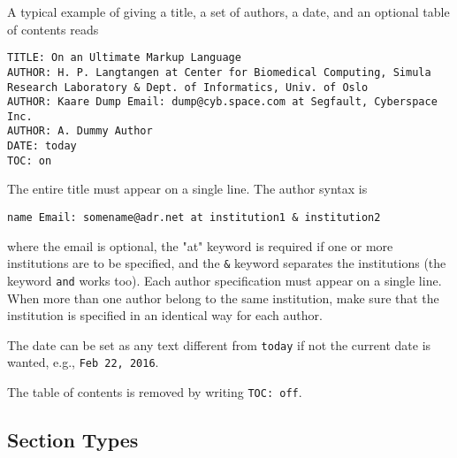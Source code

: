 \documentclass[%
oneside,                 %
final,                   %
10pt]{article}
\begin{document}
A typical example of giving a title, a set of authors, a date,
and an optional table of contents
reads
\begin{Verbatim}[numbers=none,fontsize=\fontsize{9pt}{9pt},baselinestretch=0.85,xleftmargin=0mm]
TITLE: On an Ultimate Markup Language
AUTHOR: H. P. Langtangen at Center for Biomedical Computing, Simula Research Laboratory & Dept. of Informatics, Univ. of Oslo
AUTHOR: Kaare Dump Email: dump@cyb.space.com at Segfault, Cyberspace Inc.
AUTHOR: A. Dummy Author
DATE: today
TOC: on
\end{Verbatim}
The entire title must appear on a single line.
The author syntax is
\begin{Verbatim}[numbers=none,fontsize=\fontsize{9pt}{9pt},baselinestretch=0.85,xleftmargin=0mm]
name Email: somename@adr.net at institution1 & institution2
\end{Verbatim}
where the email is optional, the "at" keyword is required if one or
more institutions are to be specified, and the \Verb!&! keyword
separates the institutions (the keyword \Verb!and! works too).
Each author specification must appear
on a single line.
When more than one author belong to the
same institution, make sure that the institution is specified in an identical
way for each author.

The date can be set as any text different from \Verb!today! if not the
current date is wanted, e.g., \Verb!Feb 22, 2016!.

The table of contents is removed by writing \Verb!TOC: off!.


\subsection{Section Types}
\label{quick:sections}
\end{document}
